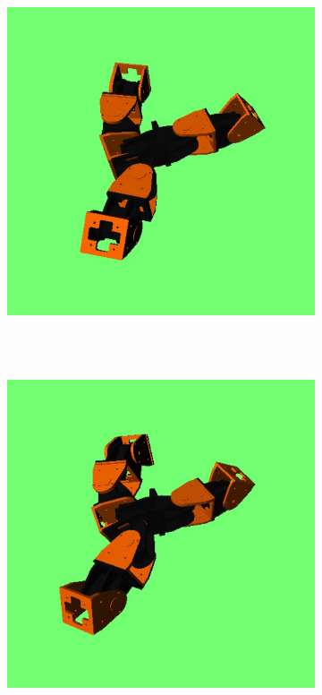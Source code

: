 \begin{figure}[h]
\begin{subfigure}[b]{0.18\textwidth}
                 \\~
        \end{subfigure}
        ~
        \begin{subfigure}[b]{0.18\textwidth}
                \centering
                \includegraphics[width=\textwidth]{images/results_7_gait_07.png}
                \\~
        \end{subfigure}
        ~
        \begin{subfigure}[b]{0.18\textwidth}
         	   \centering
                \includegraphics[width=\textwidth]{images/results_7_gait_08.png}

\end{subfigure}
\end{figure}
